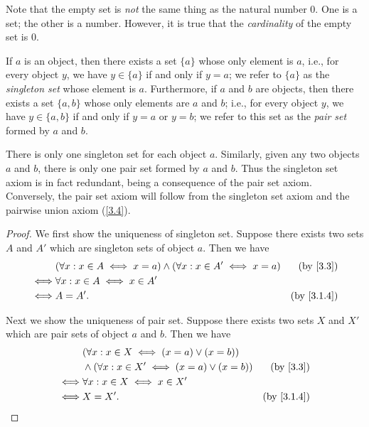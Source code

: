 \begin{rmk}\label{3.1.8}
  Note that the empty set is \emph{not} the same thing as the natural number \(0\).
  One is a set;
  the other is a number.
  However, it is true that the \emph{cardinality} of the empty set is \(0\).
\end{rmk}

\begin{ax}\label{3.3}
  If \(a\) is an object, then there exists a set \(\{a\}\) whose only element is \(a\), i.e., for every object \(y\), we have \(y \in \{a\}\) if and only if \(y = a\);
  we refer to \(\{a\}\) as the \emph{singleton set} whose element is \(a\).
  Furthermore, if \(a\) and \(b\) are objects, then there exists a set \(\{a, b\}\) whose only elements are \(a\) and \(b\);
  i.e., for every object \(y\), we have \(y \in \{a, b\}\) if and only if \(y = a\) or \(y = b\);
  we refer to this set as the \emph{pair set} formed by \(a\) and \(b\).
\end{ax}

\begin{rmk}\label{3.1.9}
  There is only one singleton set for each object \(a\).
  Similarly, given any two objects \(a\) and \(b\), there is only one pair set formed by \(a\) and \(b\).
  Thus the singleton set axiom is in fact redundant, being a consequence of the pair set axiom.
  Conversely, the pair set axiom will follow from the singleton set axiom and the pairwise union axiom (\cref{3.4}).
\end{rmk}

\begin{proof}
  We first show the uniqueness of singleton set.
  Suppose there exists two sets \(A\) and \(A'\) which are singleton sets of object \(a\).
  Then we have
  \begin{align*}
         & (\forall x : x \in A \iff x = a) \land (\forall x : x \in A' \iff x = a) & \text{(by \cref{3.3})}   \\
    \iff & \forall x : x \in A \iff x \in A'                                                                   \\
    \iff & A = A'.                                                                  & \text{(by \cref{3.1.4})}
  \end{align*}

  Next we show the uniqueness of pair set.
  Suppose there exists two sets \(X\) and \(X'\) which are pair sets of object \(a\) and \(b\).
  Then we have
  \begin{align*}
         & (\forall x : x \in X \iff (x = a) \lor (x = b))                                   \\
         & \land (\forall x : x \in X' \iff (x = a) \lor (x = b)) & \text{(by \cref{3.3})}   \\
    \iff & \forall x : x \in X \iff x \in X'                                                 \\
    \iff & X = X'.                                                & \text{(by \cref{3.1.4})}
  \end{align*}
\end{proof}

